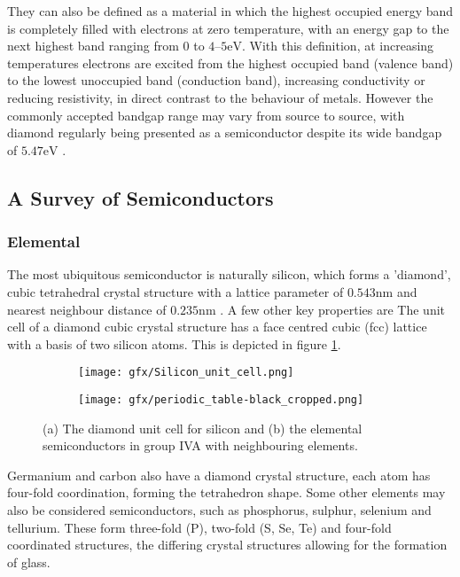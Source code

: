They can also be defined as a material in which the highest occupied energy band is completely filled with electrons at zero temperature, with an energy gap to the next highest band ranging from 0 to $4\text{--}5\si{\electronvolt}$. With this definition, at increasing temperatures electrons are excited from the highest occupied band (valence band) to the lowest unoccupied band (conduction band), increasing conductivity or reducing resistivity, in direct contrast to the behaviour of metals. However the commonly accepted bandgap range may vary from source to source, with diamond regularly being presented as a semiconductor despite its wide bandgap of $5.47\si{\electronvolt}$ \cite{wort:2008}.

\subsection{A Survey of Semiconductors}
\subsubsection{Elemental}
The most ubiquitous semiconductor is naturally silicon, which forms a 'diamond', cubic tetrahedral crystal structure with a lattice parameter of $0.543\si{\nano\metre}$ and nearest neighbour distance of $0.235\si{\nano\metre}$ \cite{haynes:2017}. A few other key properties are  The unit cell of a diamond cubic crystal structure has a face centred cubic (fcc) lattice with a basis of two silicon atoms. This is depicted in figure \ref{fig:silicon_unit_cell}.
\begin{figure}
\centering
\begin{subfigure}[b]{0.45\textwidth}
    \centering
    \texttt{[image: gfx/Silicon\_unit\_cell.png]}
    \caption{}
    \label{fig:silicon_unit_cell}
\end{subfigure}
\hfill
\begin{subfigure}[b]{0.45\textwidth}
    \centering
    \texttt{[image: gfx/periodic\_table-black\_cropped.png]}
    \caption{}
    \label{fig:periodic_table_groupIV_crop}
\end{subfigure}
\caption{(a) The diamond unit cell for silicon and (b) the elemental semiconductors in group IVA with neighbouring elements.}
\end{figure}

Germanium and carbon also have a diamond crystal structure, each atom has four-fold coordination, forming the tetrahedron shape. Some other elements may also be considered semiconductors, such as phosphorus, sulphur, selenium and tellurium. These form three-fold (P), two-fold (S, Se, Te) and four-fold coordinated structures, the differing crystal structures allowing for the formation of glass.

